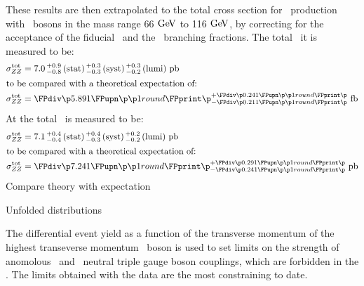 These results are then extrapolated to the total cross section for \ZZ\
production with \Z\ bosons in the mass range 66$\GeV$ to 116$\GeV$, by
correcting for the acceptance of the fiducial \phasespace\ and the \Zll\
branching fractions. The total \cx\ it  is measured to be:
\begin{align}
\sigmaTotZZ &= \ZZSevenTeVTotalCrossSection \\
\intertext{to be compared with a theoretical expectation of:}
\sigmaTotZZ &= \ZZSevenTeVTheoryTotalCrossSection
\end{align}
At  the total \cx\ is measured to be:
\begin{align}
\sigmaTotZZ &= \ZZEightTeVTotalCrossSection \\
\intertext{to be compared with a theoretical expectation of:}
\sigmaTotZZ &= \ZZEightTeVTheoryTotalCrossSection
\end{align}
Compare theory with expectation

Unfolded distributions

The differential event yield as a function of the transverse momentum of the
highest transeverse momentum \Z\ boson is used to set limits on the strength of
anomolous \ZZZ\ and \ZZg\ neutral triple gauge boson couplings, which are
forbidden in the \sm. 
The limits obtained with the \sqrtseq{8} data are the most constraining to date.
